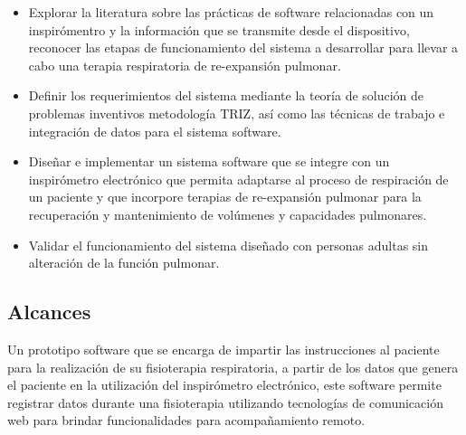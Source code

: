 \documentclass[12pt]{article}
\begin{document}
\begin{itemize}
\item Explorar la literatura sobre las pr\'acticas de software relacionadas con un inspir\'omentro y la informaci\'on que se transmite desde el dispositivo, reconocer las etapas de funcionamiento del sistema a desarrollar para llevar a cabo una terapia respiratoria de  re-expansi\'on pulmonar.

\item Definir los requerimientos del sistema mediante la teor\'ia de soluci\'on de problemas inventivos metodolog\'ia TRIZ, as\'i como las t\'ecnicas de trabajo e integraci\'on de datos para el sistema software.

\item Dise\~{n}ar e implementar un sistema software que se integre con un inspir\'ometro electr\'onico que permita adaptarse al proceso de respiraci\'on de un paciente y que incorpore terapias de re-expansi\'on pulmonar para la recuperaci\'on y mantenimiento de vol\'umenes y capacidades pulmonares.


\item Validar el funcionamiento del sistema dise\~{n}ado con personas adultas sin alteraci\'on de la funci\'on pulmonar.  %

\end{itemize}

\subsection{Alcances}

Un prototipo software que se encarga de impartir las instrucciones al paciente para la realizaci\'on de su fisioterapia respiratoria, a partir de los datos que genera el paciente en la utilizaci\'on del inspir\'ometro electr\'onico, este software permite registrar datos durante una fisioterapia utilizando tecnolog\'ias de comunicación web para brindar funcionalidades para acompa\~{n}amiento remoto. 
\end{document}

